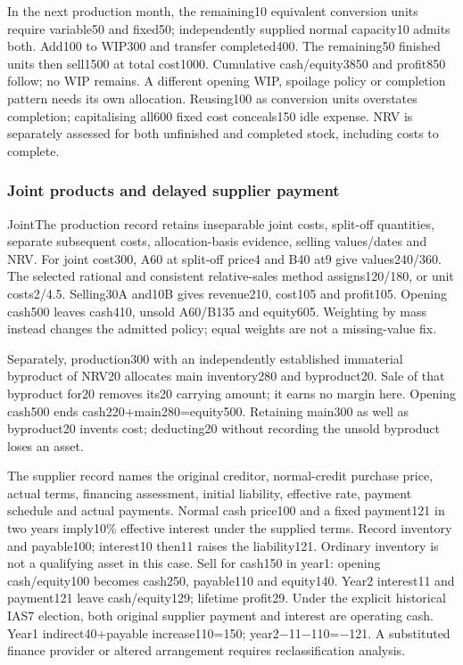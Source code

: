 In the next production month, the remaining10 equivalent conversion units require variable50 and fixed50; independently supplied normal capacity10 admits both. Add100 to WIP300 and transfer completed400. The remaining50 finished units then sell1500 at total cost1000. Cumulative cash/equity3850 and profit850 follow; no WIP remains. A different opening WIP, spoilage policy or completion pattern needs its own allocation. Reusing100 as conversion units overstates completion; capitalising all600 fixed cost conceals150 idle expense. NRV is separately assessed for both unfinished and completed stock, including costs to complete.

\hypertarget{joint-products-and-delayed-supplier-payment}{%
\subsubsection{Joint products and delayed supplier payment}\label{joint-products-and-delayed-supplier-payment}}

JointThe production record retains inseparable joint costs, split-off quantities, separate subsequent costs, allocation-basis evidence, selling values/dates and NRV. For joint cost300, A60 at split-off price4 and B40 at9 give values240/360. The selected rational and consistent relative-sales method assigns120/180, or unit costs2/4.5. Selling30A and10B gives revenue210, cost105 and profit105. Opening cash500 leaves cash410, unsold A60/B135 and equity605. Weighting by mass instead changes the admitted policy; equal weights are not a missing-value fix.

Separately, production300 with an independently established immaterial byproduct of NRV20 allocates main inventory280 and byproduct20. Sale of that byproduct for20 removes its20 carrying amount; it earns no margin here. Opening cash500 ends cash220+main280=equity500. Retaining main300 as well as byproduct20 invents cost; deducting20 without recording the unsold byproduct loses an asset.

The supplier record names the original creditor, normal-credit purchase price, actual terms, financing assessment, initial liability, effective rate, payment schedule and actual payments. Normal cash price100 and a fixed payment121 in two years imply10\% effective interest under the supplied terms. Record inventory and payable100; interest10 then11 raises the liability121. Ordinary inventory is not a qualifying asset in this case. Sell for cash150 in year1: opening cash/equity100 becomes cash250, payable110 and equity140. Year2 interest11 and payment121 leave cash/equity129; lifetime profit29. Under the explicit historical IAS7 election, both original supplier payment and interest are operating cash. Year1 indirect40+payable increase110=150; year2−11−110=−121. A substituted finance provider or altered arrangement requires reclassification analysis.

